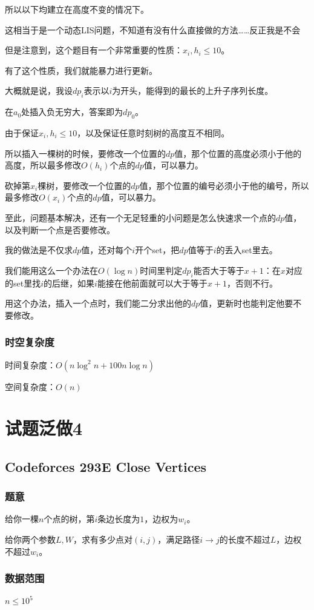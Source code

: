 \documentclass{ctexart}
\begin{document}
所以以下均建立在高度不变的情况下。

这相当于是一个动态LIS问题，不知道有没有什么直接做的方法……反正我是不会

但是注意到，这个题目有一个非常重要的性质：$x_i,h_i \le 10$。

有了这个性质，我们就能暴力进行更新。

大概就是说，我设$dp_i$表示以$i$为开头，能得到的最长的上升子序列长度。

在$a_0$处插入负无穷大，答案即为$dp_0$。

由于保证$x_i,h_i \le 10$，以及保证任意时刻树的高度互不相同。

所以插入一棵树的时候，要修改一个位置的$dp$值，那个位置的高度必须小于他的高度，所以最多修改$O(h_i)$个点的$dp$值，可以暴力。

砍掉第$x_i$棵树，要修改一个位置的$dp$值，那个位置的编号必须小于他的编号，所以最多修改$O(x_i)$个点的$dp$值，可以暴力。

至此，问题基本解决，还有一个无足轻重的小问题是怎么快速求一个点的$dp$值，以及判断一个点是否要修改。

我的做法是不仅求$dp$值，还对每个$i$开个set，把$dp$值等于$i$的丢入set里去。

我们能用这么一个办法在$O(\log n)$时间里判定$dp_i$能否大于等于$x+1$：在$x$对应的set里找$i$的后继，如果$i$能接在他前面就可以大于等于$x+1$，否则不行。

用这个办法，插入一个点时，我们能二分求出他的$dp$值，更新时也能判定他要不要修改。
\subsubsection{时空复杂度}
时间复杂度：$O(n \log^2 n+100n\log n)$

空间复杂度：$O(n)$
\newpage
\section{试题泛做4}
\subsection{Codeforces 293E Close Vertices}
\subsubsection{题意}
给你一棵$n$个点的树，第$i$条边长度为$1$，边权为$w_i$。

给你两个参数$L,W$，求有多少点对$(i,j)$，满足路径$i \rightarrow j$的长度不超过$L$，边权不超过$w_i$。
\subsubsection{数据范围}
$n \le 10^5$
\end{document}
